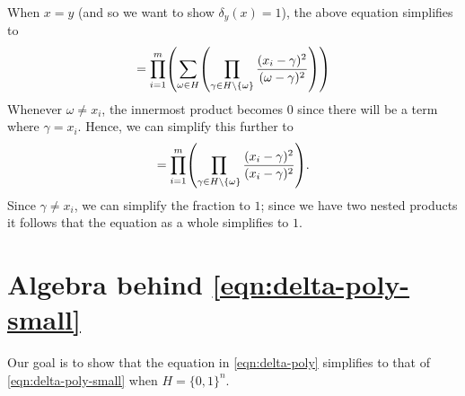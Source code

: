 \documentclass[english]{reedthesis}
\theoremstyle{plain}
\theoremstyle{definition}
\theoremstyle{remark}
\begin{document}
\begin{appendices}
When $x = y$ (and so we want to show $\delta_{y}(x) = 1$), the above equation
simplifies to
\begin{equation}
  [x = y] = \prod_{i = 1}^{m}\mleft(\sum_{\omega \in H}\mleft(
    \prod_{\gamma \in H \setminus \{\omega\}}\frac{(x_{i} - \gamma)^{2}}{(\omega - \gamma)^{2}}
  \mright)\mright)
\end{equation}
Whenever $\omega \ne x_{i}$, the innermost product becomes $0$ since there will be a
term where $\gamma = x_{i}$. Hence, we can simplify this further to
\begin{equation}
  [x = y] = \prod_{i=1}^{m}\mleft(\prod_{\gamma \in H \setminus \{\omega\}}\frac{(x_{i} - \gamma)^{2}}{(x_{i} - \gamma)^{2}}\mright).
\end{equation}
Since $\gamma \ne x_{i}$, we can simplify the fraction to $1$; since we have two nested
products it follows that the equation as a whole simplifies to $1$.

\section{Algebra behind \cref{eqn:delta-poly-small}}\label{sec:delta-poly-small}

Our goal is to show that the equation in \cref{eqn:delta-poly} simplifies to
that of \cref{eqn:delta-poly-small} when $H = \{0, 1\}^{n}$.


\end{appendices}
\end{document}

